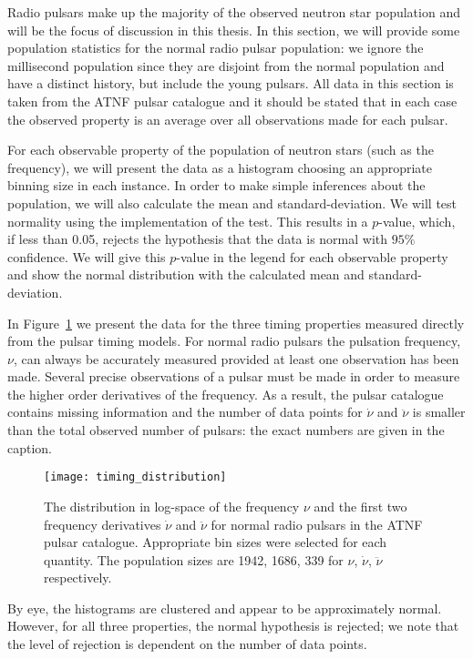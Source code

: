 Radio pulsars make up the majority of the observed neutron star population and will be
the focus of discussion in this thesis. In this section, we will provide some
population statistics for the normal radio pulsar population: we ignore the
millisecond population since they are disjoint from the normal population and
have a distinct history, but include the young pulsars. All data
in this section is taken from the ATNF pulsar catalogue \citet{ATNF} and it
should be stated that in each case the observed property is an average
over all observations made for each pulsar.

For each observable property of the population of neutron stars (such as the
frequency), we will present the data as a histogram choosing an appropriate
binning size in each instance. In order to make simple inferences about the
population, we will also calculate the mean and standard-deviation.
We will test normality using the \citet{Scipy} implementation of the
\citet{d1971omnibus} test. This results in a $p$-value, which, if less than
0.05, rejects the hypothesis that the data is normal with $95\%$ confidence. We
will give this $p$-value in the legend for each observable property and show
the normal distribution with the calculated mean and standard-deviation.


In Figure~\ref{fig: pop stats timing} we present the data for the three timing
properties measured directly from the pulsar timing models. For normal radio
pulsars the pulsation frequency, $\nu$, can always be accurately measured
provided at least
one observation has been made.  Several precise observations of a pulsar must
be made in order to measure the higher order derivatives of the frequency. As a
result, the pulsar catalogue contains missing information and the number of
data points for $\dot{\nu}$ and $\ddot{\nu}$ is smaller than the total observed
number of pulsars: the exact numbers are given in the caption.
\begin{figure}[htb]
\centering
\texttt{[image: timing\_distribution]}
\caption{The distribution in log-space of the frequency $\nu$ and the first two
frequency derivatives $\dot{\nu}$ and $\ddot{\nu}$ for normal radio pulsars in the
ATNF pulsar catalogue. Appropriate bin sizes were selected for each quantity.
The population sizes are 1942, 1686, 339 for $\nu$,
$\dot{\nu}$, $\ddot{\nu}$ respectively.}
\label{fig: pop stats timing}
\end{figure}
By eye, the histograms are clustered and appear to be approximately normal.
However, for all three properties, the normal hypothesis is rejected; we note
that the level of rejection is dependent on the number of data points.

